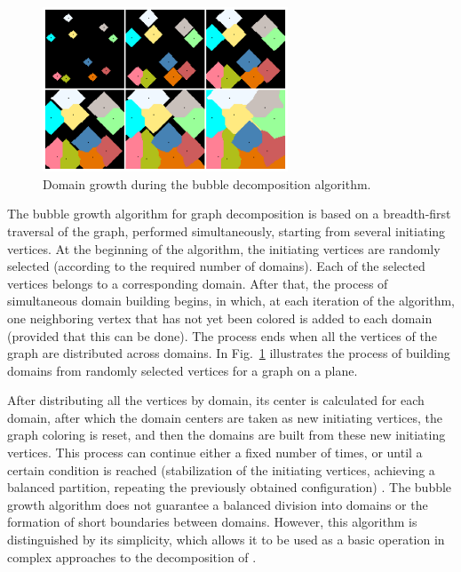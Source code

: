 \documentclass[
11pt,%
tightenlines,%
twoside,%
onecolumn,%
nofloats,%
nobibnotes,%
nofootinbib,%
superscriptaddress,%
noshowpacs,%
centertags]%
{revtex4}
\begin{document}
\begin{figure}[h]
\setcaptionmargin{5mm}
\onelinecaptionstrue  %
\includegraphics[width=0.65\textwidth]{pics/incr.pdf}
\caption{Domain growth during the bubble decomposition algorithm.}\label{fig:incr}
\end{figure}

The bubble growth algorithm for graph decomposition \cite{17Fan} is based on a breadth-first traversal of the graph, performed simultaneously, starting from several initiating vertices.
At the beginning of the algorithm, the initiating vertices are randomly selected (according to the required number of domains).
Each of the selected vertices belongs to a corresponding domain.
After that, the process of simultaneous domain building begins, in which, at each iteration of the algorithm, one neighboring vertex that has not yet been colored is added to each domain (provided that this can be done).
The process ends when all the vertices of the graph are distributed across domains.
In Fig.~\ref{fig:incr} illustrates the process of building domains from randomly selected vertices for a graph on a plane.

After distributing all the vertices by domain, its center is calculated for each domain, after which the domain centers are taken as new initiating vertices, the graph coloring is reset, and then the domains are built from these new initiating vertices.
This process can continue either a fixed number of times, or until a certain condition is reached (stabilization of the initiating vertices, achieving a balanced partition, repeating the previously obtained configuration) \cite{18Golovchenko}.
The bubble growth algorithm does not guarantee a balanced division into domains or the formation of short boundaries between domains.
However, this algorithm is distinguished by its simplicity, which allows it to be used as a basic operation in complex approaches to the decomposition of \cite{19Wu}.
\end{document}
